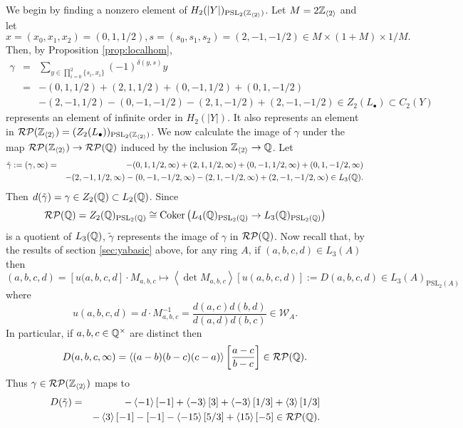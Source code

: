 \documentclass[12pt]{amsart}
\theoremstyle{definition}
\newcommand{\Q}{\Bbb{Q}}
\newcommand{\Z}{\Bbb{Z}}
\newcommand{\wn}[1]{\mathcal{W}_{#1}}%
\newcommand{\pspl}[2]{\mathrm{PSL}_{#1}(#2)}
\newcommand{\rpb}[1]{\mathcal{RP}(#1)}%
\newcommand{\gpb}[1]{\left[ #1\right]} %
\newcommand{\<}{\langle}
\renewcommand{\>}{\rangle}
\newcommand{\coker}[1]{\mathrm{Coker}\left(#1\right)}
\newcommand{\an}[1]{\left\langle{#1}\right\rangle}
\begin{document}
We begin by finding a nonzero element of $H_2(|Y|)_{\pspl{2}{\Z_{\an{2}}}}$. Let $M=2\Z_{\an{2}}$ and let 
\[
x=(x_0,x_1,x_2)=(0,1,1/2), s=(s_0,s_1,s_2)=(2,-1,-1/2)\in M\times (1+M)\times 1/M.
\]
Then,  by Proposition \ref{prop:localhom},
\begin{eqnarray*}
\gamma&=&\sum_{y\in\prod_{i=0}^2\{ s_i,x_i\} } (-1)^{\delta(y,s)}y\\
&=&-(0,1,1/2)+(2,1,1/2)+(0,-1,1/2)+(0,1,-1/2)\\
&&-(2,-1,1/2)-(0,-1,-1/2)-(2,1,-1/2)+(2,-1,-1/2)\in Z_2(L_\bullet)\subset C_2(Y)
\end{eqnarray*}
represents an element of infinite order in $H_2(|Y|)$. It also represents an element in $\rpb{\Z_{\an{2}}}=(Z_2(L_\bullet))_{\pspl{2}{\Z_{\an{2}}}}$. We now calculate the image of $\gamma$  under the map $\rpb{\Z_{\an{2}}}\to\rpb{\Q}$ induced by the inclusion $\Z_{\an{2}}\to \Q$. Let
\begin{eqnarray*}
\tilde{\gamma}:=(\gamma,\infty)&=&-(0,1,1/2,\infty)+(2,1,1/2,\infty)+(0,-1,1/2,\infty)+(0,1,-1/2,\infty)\\
&&-(2,-1,1/2,\infty)-(0,-1,-1/2,\infty)-(2,1,-1/2,\infty)+(2,-1,-1/2,\infty)\in L_3(\Q).\\
\end{eqnarray*}
Then $d(\tilde{\gamma})=\gamma\in Z_2(\Q)\subset L_2(\Q)$. Since 
\[
\rpb{\Q}=Z_2(\Q)_{\pspl{2}{\Q}}\cong\coker{L_4(\Q)_{\pspl{2}{\Q}}\to L_3(\Q)_{\pspl{2}{\Q}}}
\]
is a quotient of $L_3(\Q)$, $\tilde{\gamma}$ represents the image of $\gamma$ in $\rpb{\Q}$. Now recall that,  by the results of section \ref{sec:yabasic} above, for any ring $A$, 
if $(a,b,c,d)\in L_3(A)$ then 
\[
(a,b,c,d)=[u(a,b,c,d]\cdot M_{a,b,c}\mapsto \an{\det{M_{a,b,c}}}[u(a,b,c,d)]:=D(a,b,c,d)\in L_3(A)_{\pspl{2}{A}}
\] 
where 
\[
u(a,b,c,d)=d\cdot M_{a,b,c}^{-1}=\frac{d(a,c)d(b,d)}{d(a,d)d(b,c)}\in \wn{A}.
\]
In particular, if $a,b,c\in \Q^\times$ are distinct then
 \[
D(a,b,c,\infty)=\an{(a-b)(b-c)(c-a)}\gpb{\frac{a-c}{b-c}}\in \rpb{\Q}.
\]
Thus $\gamma\in \rpb{\Z_{\an{2}}}$ maps to 
\begin{eqnarray*}
D(\tilde{\gamma})&=&-\an{-1}\gpb{-1}+\an{-3}\gpb{3}+\an{-3}\gpb{1/3}+\an{3}\gpb{1/3}\\
&&-\an{3}\gpb{-1}-\gpb{-1}-\an{-15}\gpb{5/3}+\an{15}\gpb{-5}\in \rpb{\Q}.\\
\end{eqnarray*}
\end{document}
